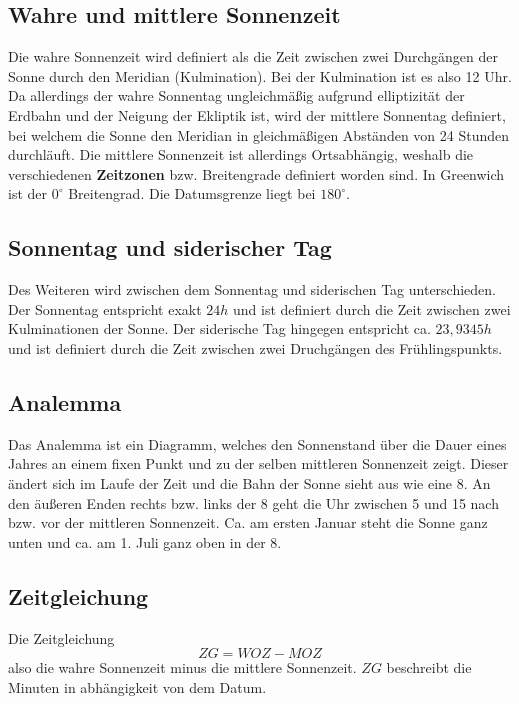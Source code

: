 \documentclass[a4paper,12pt]{article}
\begin{document}
\subsection{Wahre und mittlere Sonnenzeit}
Die wahre Sonnenzeit wird definiert als die Zeit zwischen zwei Durchgängen der Sonne durch den Meridian (Kulmination). Bei der Kulmination ist es also 12 Uhr. Da allerdings der wahre Sonnentag ungleichmäßig aufgrund elliptizität der Erdbahn und der Neigung der Ekliptik ist, wird der mittlere Sonnentag definiert, bei welchem die Sonne den Meridian in gleichmäßigen Abständen von 24 Stunden durchläuft. Die mittlere Sonnenzeit ist allerdings Ortsabhängig, weshalb die verschiedenen \textbf{Zeitzonen} bzw. Breitengrade definiert worden sind. In Greenwich ist der $0^{\circ}$ Breitengrad. Die Datumsgrenze liegt bei $180^{\circ}$.

\subsection{Sonnentag und siderischer Tag}
Des Weiteren wird zwischen dem Sonnentag und siderischen Tag unterschieden. Der Sonnentag entspricht exakt $24h$ und ist definiert durch die Zeit zwischen zwei Kulminationen der Sonne. Der siderische Tag hingegen entspricht ca. $23,9345h$ und ist definiert durch die Zeit zwischen zwei Druchgängen des Frühlingspunkts.

\subsection{Analemma}
Das Analemma ist ein Diagramm, welches den Sonnenstand über die Dauer eines Jahres an einem fixen Punkt und zu der selben mittleren Sonnenzeit zeigt. Dieser ändert sich im Laufe der Zeit und die Bahn der Sonne sieht aus wie eine 8. An den äußeren Enden rechts bzw. links der 8 geht die Uhr zwischen 5 und 15 nach bzw. vor der mittleren Sonnenzeit. Ca. am ersten Januar steht die Sonne ganz unten und ca. am 1. Juli ganz oben in der 8.

\subsection{Zeitgleichung}
Die Zeitgleichung 
\[ 
        ZG=WOZ-MOZ
\] 
also die wahre Sonnenzeit minus die mittlere Sonnenzeit. $ZG$ beschreibt die Minuten in abhängigkeit von dem Datum.
\end{document}
